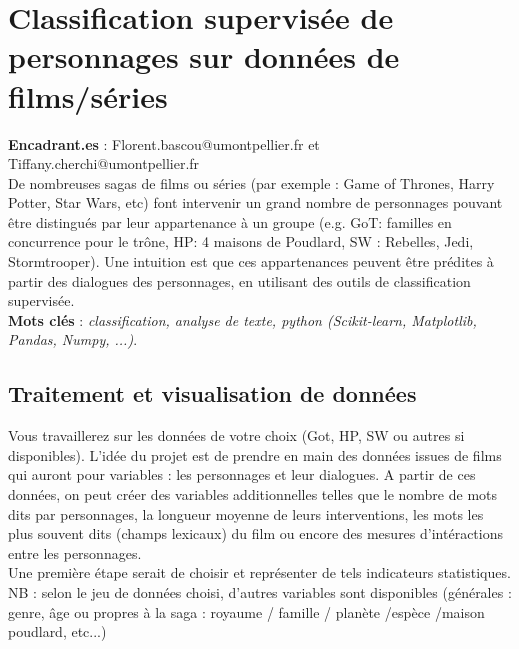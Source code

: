\documentclass{article}
\begin{document}
\section*{Classification supervisée de personnages sur données de films/séries} \vspace{.5cm}

\textbf{Encadrant.es} : Florent.bascou@umontpellier.fr et Tiffany.cherchi@umontpellier.fr \\

De nombreuses sagas de films ou séries (par exemple : Game of Thrones, Harry Potter, Star Wars, etc) font intervenir un grand nombre de personnages pouvant être distingués par leur appartenance à un groupe (e.g. GoT: familles en concurrence pour le trône, HP: 4 maisons de Poudlard, SW : Rebelles, Jedi, Stormtrooper). Une intuition est que ces appartenances peuvent être prédites à partir des dialogues des personnages, en utilisant des outils de classification supervisée. \\

\textbf{Mots clés} : \textit{classification, analyse de texte, python (Scikit-learn, Matplotlib, Pandas, Numpy, ...)}.\vspace{.5cm}



\subsection*{Traitement et visualisation de données}

    Vous travaillerez sur les données de votre choix (Got, HP, SW ou autres si disponibles).
    L'idée du projet est de prendre en main des données issues de films qui auront pour variables : les personnages et leur dialogues. A partir de ces données, on peut créer des variables additionnelles telles que le nombre de mots dits par personnages, la longueur moyenne de leurs interventions, les mots les plus souvent dits (champs lexicaux) du film ou encore des mesures d'intéractions entre les personnages. \\

    Une première étape serait de choisir et représenter de tels indicateurs statistiques. \\

    NB : selon le jeu de données choisi, d'autres variables sont disponibles (générales : genre, âge ou propres à la saga : royaume / famille / planète /espèce /maison poudlard, etc...)
\end{document}
